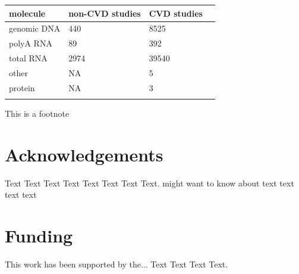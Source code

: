 \documentclass{bioinfo}
\begin{document}
\begin{table}[!t]
	 {\begin{tabular}{@{}llll@{}}\toprule 
    molecule &non-CVD studies & CVD studies \\ \midrule
 genomic DNA &            440 &        8525  \\
   polyA RNA &             89 &         392  \\
   total RNA &           2974 &       39540  \\
       other &             NA &           5  \\
     protein &             NA &           3  \\ \botrule
	\end{tabular}}{This is a footnote}
\end{table}






\section*{Acknowledgements}

Text Text Text Text Text Text  Text Text.  \citealp{Boffelli03} might want to know about  text
text text text\vspace*{-12pt}

\section*{Funding}

This work has been supported by the... Text Text  Text Text.\vspace*{-12pt}

%
%
%
%

%
%
%

\end{document}
